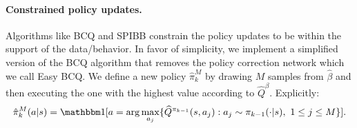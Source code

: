 

\paragraph{Constrained policy updates.}
Algorithms like BCQ \citep{fujimoto2018off} and SPIBB \citep{laroche2019safe} constrain the policy updates to be within the support of the data/behavior.
In favor of simplicity, we implement a simplified version of the BCQ algorithm that removes the policy correction network which we call Easy BCQ.
We define a new policy $ \hat \pi^M_{k}$ by drawing $ M $ samples from $ \hat \beta$ and then executing the one with the highest value according to $ \widehat Q^\beta$. Explicitly:
\begin{align}
    \hat \pi^M_{k}(a|s) = \one[a = \arg\max_{a_j} \{\widehat Q^{\pi_{k-1}}(s, a_j): a_j \sim \pi_{k-1}(\cdot|s),\ 1 \leq j \leq M\}].
\end{align}


